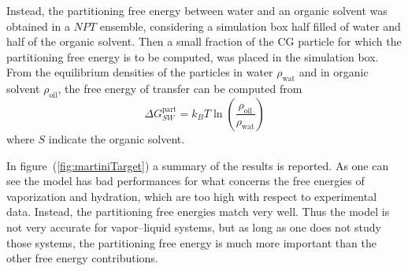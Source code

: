 Instead, the partitioning free energy between water and an organic solvent was obtained in a $NPT$ ensemble, considering a simulation box half filled of water and half of the organic solvent. Then a small fraction of the \ac{CG} particle for which the partitioning free energy is to be computed, was placed in the simulation box. From the equilibrium densities of the particles in water $\rho_{\text{wat}}$ and in organic solvent $\rho_{\text{oil}}$, the free energy of transfer can be computed from
\begin{equation*}
	\Delta G_{SW}^{\text{part}} = k_B T \ln \left ( \frac{\rho_{\text{oil}}}{\rho_{\text{wat}}}\right )
\end{equation*}
where $S$ indicate the organic solvent.

In figure~(\ref{fig:martiniTarget}) a summary of the results is reported. As one can see the model has bad performances for what concerns the free energies of vaporization and hydration, which are too high with respect to experimental data. Instead, the partitioning free energies match very well. Thus the model is not very accurate for vapor--liquid systems, but as long as one does not study those systems, the partitioning free energy is much more important than the other free energy contributions.
